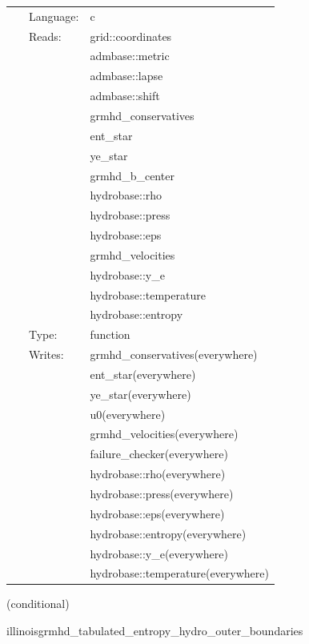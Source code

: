 \documentclass{article}
\begin{document}
 \begin{tabular*}{160mm}{cll} 
~ & Language:  & c \\ 
~ & Reads:  & grid::coordinates \\ 
~& ~ &admbase::metric\\ 
~& ~ &admbase::lapse\\ 
~& ~ &admbase::shift\\ 
~& ~ &grmhd\_conservatives\\ 
~& ~ &ent\_star\\ 
~& ~ &ye\_star\\ 
~& ~ &grmhd\_b\_center\\ 
~& ~ &hydrobase::rho\\ 
~& ~ &hydrobase::press\\ 
~& ~ &hydrobase::eps\\ 
~& ~ &grmhd\_velocities\\ 
~& ~ &hydrobase::y\_e\\ 
~& ~ &hydrobase::temperature\\ 
~& ~ &hydrobase::entropy\\ 
~ & Type:  & function \\ 
~ & Writes:  & grmhd\_conservatives(everywhere) \\ 
~& ~ &ent\_star(everywhere)\\ 
~& ~ &ye\_star(everywhere)\\ 
~& ~ &u0(everywhere)\\ 
~& ~ &grmhd\_velocities(everywhere)\\ 
~& ~ &failure\_checker(everywhere)\\ 
~& ~ &hydrobase::rho(everywhere)\\ 
~& ~ &hydrobase::press(everywhere)\\ 
~& ~ &hydrobase::eps(everywhere)\\ 
~& ~ &hydrobase::entropy(everywhere)\\ 
~& ~ &hydrobase::y\_e(everywhere)\\ 
~& ~ &hydrobase::temperature(everywhere)\\ 
\end{tabular*} 


\vspace{5mm}

   (conditional) 

\hspace{5mm} illinoisgrmhd\_tabulated\_entropy\_hydro\_outer\_boundaries 

\hspace{5mm}{\it entropy+tabulated version of illinoisgrmhd\_outer\_boundaries } 
\end{document}
